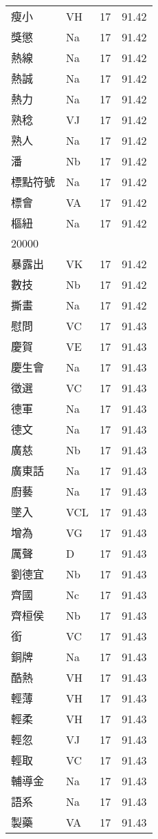 \documentclass[twocolumn]{book}
\begin{document}
\begin{supertabular}{llrr}
瘦小 & VH & 17 &  91.42\\
獎懲 & Na & 17 &  91.42\\
熱線 & Na & 17 &  91.42\\
熱誠 & Na & 17 &  91.42\\
熱力 & Na & 17 &  91.42\\
熟稔 & VJ & 17 &  91.42\\
熟人 & Na & 17 &  91.42\\
潘 & Nb & 17 &  91.42\\
標點符號 & Na & 17 &  91.42\\
標會 & VA & 17 &  91.42\\
樞紐 & Na & 17 &  91.42\\
20000\\
暴露出 & VK & 17 &  91.42\\
數技 & Nb & 17 &  91.42\\
撕畫 & Na & 17 &  91.42\\
慰問 & VC & 17 &  91.43\\
慶賀 & VE & 17 &  91.43\\
慶生會 & Na & 17 &  91.43\\
徵選 & VC & 17 &  91.43\\
德軍 & Na & 17 &  91.43\\
德文 & Na & 17 &  91.43\\
廣慈 & Nb & 17 &  91.43\\
廣東話 & Na & 17 &  91.43\\
廚藝 & Na & 17 &  91.43\\
墜入 & VCL & 17 &  91.43\\
增為 & VG & 17 &  91.43\\
厲聲 & D & 17 &  91.43\\
劉德宜 & Nb & 17 &  91.43\\
齊國 & Nc & 17 &  91.43\\
齊桓侯 & Nb & 17 &  91.43\\
銜 & VC & 17 &  91.43\\
銅牌 & Na & 17 &  91.43\\
酷熱 & VH & 17 &  91.43\\
輕薄 & VH & 17 &  91.43\\
輕柔 & VH & 17 &  91.43\\
輕忽 & VJ & 17 &  91.43\\
輕取 & VC & 17 &  91.43\\
輔導金 & Na & 17 &  91.43\\
語系 & Na & 17 &  91.43\\
製藥 & VA & 17 &  91.43\\

\end{supertabular}
\end{document}
